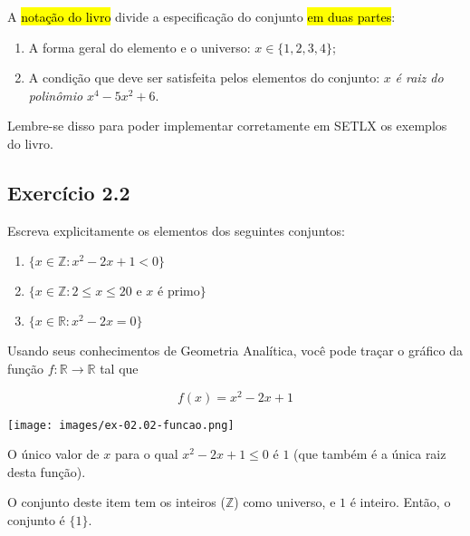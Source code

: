 \documentclass[
  letterpaper,
  DIV=11,
  numbers=noendperiod]{scrreprt}
\providecommand{\tightlist}{%
  \setlength{\itemsep}{0pt}\setlength{\parskip}{0pt}}\usepackage{longtable,booktabs,array}
\begin{document}
\begin{tcolorbox}
A {\hl{notação do livro}} divide a especificação do conjunto {\hl{em
duas partes}}:

\begin{enumerate}
\def\labelenumi{\arabic{enumi}.}
\tightlist
\item
  A forma geral do elemento e o universo: $x \in \{1, 2, 3, 4\}$;
\item
  A condição que deve ser satisfeita pelos elementos do conjunto: $x$
  \emph{é raiz do polinômio} $x^4 - 5x^2 + 6$.
\end{enumerate}

Lembre-se disso para poder implementar corretamente em SETLX os exemplos
do livro.

\end{tcolorbox}

\subsection*{Exercício 2.2}\label{exr-2-2}

Escreva explicitamente os elementos dos seguintes conjuntos:

\begin{enumerate}
\def\labelenumi{\alph{enumi})}
\item
  $\{ x \in \mathbb{Z}: x^2 - 2x + 1 < 0 \}$
\item
  $\{ x \in \mathbb{Z}: 2 \leq x \leq 20 \text{ e } x \text{ é primo} \}$
\item
  $\{ x \in \mathbb{R}: x^2 - 2x = 0 \}$
\end{enumerate}

\begin{tcolorbox}[enhanced jigsaw, left=2mm, arc=.35mm, colback=white, opacityback=0, toptitle=1mm, bottomrule=.15mm, toprule=.15mm, titlerule=0mm, opacitybacktitle=0.6, colframe=quarto-callout-important-color-frame, breakable, colbacktitle=quarto-callout-important-color!10!white, title={Resposta (a)}, leftrule=.75mm, bottomtitle=1mm, rightrule=.15mm, coltitle=black]

Usando seus conhecimentos de Geometria Analítica, você pode traçar o
gráfico da função $f : \mathbb{R}\to \mathbb{R}$ tal que

\[
f(x) = x^2 - 2x + 1
\]

\texttt{[image: images/ex-02.02-funcao.png]}

O único valor de $x$ para o qual $x^2 - 2x + 1 \leq 0$ é $1$ (que também
é a única raiz desta função).

O conjunto deste item tem os inteiros ($\mathbb{Z}$) como universo, e
$1$ é inteiro. Então, o conjunto é $\{ 1 \}$.

\end{tcolorbox}
\end{document}
